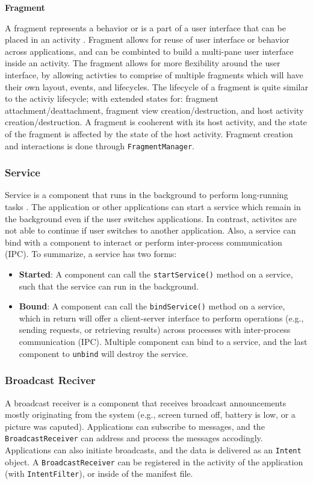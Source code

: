 \noindent \textbf{Fragment}

\noindent A fragment represents a behavior or is a part of a user interface that can be placed in an activity \cite{fragments}. Fragment allows for reuse of user interface or behavior across applications, and can be combinted to build a multi-pane user interface inside an activity. The fragment allows for more flexibility around the user interface, by allowing activties to comprise of multiple fragments which will have their own layout, events, and lifecycles. The lifecycle of a fragment is quite similar to the activiy lifecycle; with extended states for: fragment attachment/deattachment, fragment view creation/destruction, and host activity creation/destruction. A fragment is cooherent with its host activity, and the state of the fragment is affected by the state of the host activity. Fragment creation and interactions is done through \verb|FragmentManager|.  

\subsubsection{Service}
Service is a component that runs in the background to perform long-running tasks \cite{services}. The application or other applications can start a service which remain in the background even if the user switches applications. In contrast, activites are not able to continue if user switches to another application. Also, a service can bind with a component to interact or perform inter-process communication (IPC). To summarize, a service has two forms:
\begin{itemize}
    \item \textbf{Started}: A component can call the \verb|startService()| method on a service, such that the service can run in the background. 
    \item \textbf{Bound}: A component can call the \verb|bindService()| method on a service, which in return will offer a client-server interface to perform operations (e.g., sending requests, or retrieving results) across processes with inter-process communication (IPC). Multiple component can bind to a service, and the last component to \verb|unbind| will destroy the service. 
\end{itemize}

\subsubsection{Broadcast Reciver}
A broadcast receiver is a component that receives broadcast announcements mostly originating from the system (e.g., screen turned off, battery is low, or a picture was caputed). Applications can subscribe to messages, and the \verb|BroadcastReceiver| can address and process the messages accodingly. Applications can also initiate broadcasts, and the data is delivered as an \verb|Intent| object. A \verb|BroadcastReceiver| can be registered in the activity of the application (with \verb|IntentFilter|), or inside of the manifest file. 

